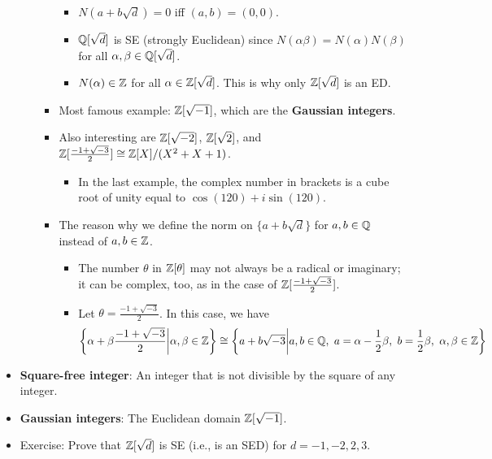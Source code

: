 \documentclass[../notes.tex]{subfiles}
\begin{document}
\begin{itemize}
\begin{enumerate}
\begin{itemize}
            \begin{itemize}
                \item $N(a+b\sqrt{d})=0$ iff $(a,b)=(0,0)$.
                \item $\mathbb{Q}[\sqrt{d}]$ is SE (strongly Euclidean) since $N(\alpha\beta)=N(\alpha)N(\beta)$ for all $\alpha,\beta\in\mathbb{Q}[\sqrt{d}]$.
                \item $N(\alpha)\in\mathbb{Z}$ for all $\alpha\in\mathbb{Z}[\sqrt{d}]$. This is why only $\mathbb{Z}[\sqrt{d}]$ is an ED.
            \end{itemize}
            \item Most famous example: $\mathbb{Z}[\sqrt{-1}]$, which are the \textbf{Gaussian integers}.
            \item Also interesting are $\mathbb{Z}[\sqrt{-2}]$, $\mathbb{Z}[\sqrt{2}]$, and $\mathbb{Z}[\frac{-1+\sqrt{-3}}{2}]\cong\mathbb{Z}[X]/(X^2+X+1)$.
            \begin{itemize}
                \item In the last example, the complex number in brackets is a cube root of unity equal to $\cos(120)+i\sin(120)$.
            \end{itemize}
            \item The reason why we define the norm on $\{a+b\sqrt{d}\}$ for $a,b\in\mathbb{Q}$ instead of $a,b\in\mathbb{Z}$.
            \begin{itemize}
                \item The number $\theta$ in $\mathbb{Z}[\theta]$ may not always be a radical or imaginary; it can be complex, too, as in the case of $\mathbb{Z}[\frac{-1+\sqrt{-3}}{2}]$.
                \item Let $\theta=\frac{-1+\sqrt{-3}}{2}$. In this case, we have
                \begin{equation*}
                    \left\{ \alpha+\beta\frac{-1+\sqrt{-3}}{2}\middle| \alpha,\beta\in\Z \right\} \cong \left\{ a+b\sqrt{-3}\middle| a,b\in\Q,\ a=\alpha-\frac{1}{2}\beta,\ b=\frac{1}{2}\beta,\ \alpha,\beta\in\Z \right\}
                \end{equation*}
            \end{itemize}
        \end{itemize}
    \end{enumerate}
    \item \textbf{Square-free integer}: An integer that is not divisible by the square of any integer.
    \item \textbf{Gaussian integers}: The Euclidean domain $\mathbb{Z}[\sqrt{-1}]$.
    \item Exercise: Prove that $\mathbb{Z}[\sqrt{d}]$ is SE (i.e., is an SED) for $d=-1,-2,2,3$.

\end{itemize}
\end{document}
